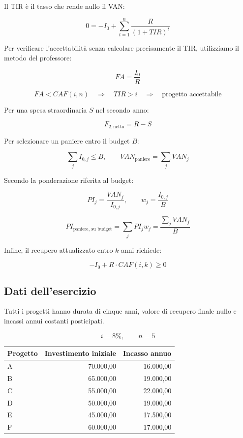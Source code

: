 \noindent Il TIR è il tasso che rende nullo il VAN:

\[
    0=-I_0+\sum_{t=1}^{n}\frac{R}{(1+TIR)^t}
\]

\noindent Per verificare l'accettabilità senza calcolare precisamente
il TIR, utilizziamo il metodo del professore:

\[
    FA=\frac{I_0}{R}
\]

\[
    FA<CAF(i,n)
    \quad\Rightarrow\quad
    TIR>i
    \quad\Rightarrow\quad
    \text{progetto accettabile}
\]

\noindent Per una spesa straordinaria $S$ nel secondo anno:

\[
    F_{2,\text{netto}}=R-S
\]

\noindent Per selezionare un paniere entro il budget $B$:

\[
    \sum_j I_{0,j}\leq B,
    \qquad
    VAN_{\text{paniere}}=\sum_j VAN_j
\]

\noindent Secondo la ponderazione riferita al budget:

\[
    PI_j=\frac{VAN_j}{I_{0,j}},
    \qquad
    w_j=\frac{I_{0,j}}{B}
\]

\[
    PI_{\text{paniere, su budget}}
    =
    \sum_j PI_jw_j
    =
    \frac{\sum_j VAN_j}{B}
\]

\noindent Infine, il recupero attualizzato entro $k$ anni richiede:

\[
    -I_0+R\cdot CAF(i,k)\geq 0
\]

\subsection*{Dati dell'esercizio}

\noindent Tutti i progetti hanno durata di cinque anni, valore
di recupero finale nullo e incassi annui costanti posticipati.

\[
    i=8\%,
    \qquad n=5
\]

\begin{center}
    \begin{tabular}{lrr}
        \hline
        Progetto & Investimento iniziale & Incasso annuo \\
        \hline
        A & 70.000,00 & 16.000,00 \\
        B & 65.000,00 & 19.000,00 \\
        C & 55.000,00 & 22.000,00 \\
        D & 50.000,00 & 19.000,00 \\
        E & 45.000,00 & 17.500,00 \\
        F & 60.000,00 & 17.000,00 \\
        \hline
    \end{tabular}
\end{center}

